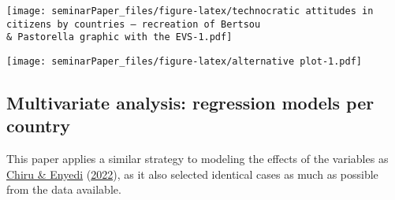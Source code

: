 \documentclass[
  12pt,
  english,
]{article}
\begin{document}
\texttt{[image: seminarPaper\_files/figure-latex/technocratic attitudes in citizens by countries --- recreation of Bertsou \\\& Pastorella graphic with the EVS-1.pdf]}

\texttt{[image: seminarPaper\_files/figure-latex/alternative plot-1.pdf]}

\hypertarget{multivariate-analysis-regression-models-per-country}{%
\subsection{Multivariate analysis: regression models per
country}\label{multivariate-analysis-regression-models-per-country}}

This paper applies a similar strategy to modeling the effects of the
variables as \protect\hyperlink{ref-chiru2022wants}{Chiru \& Enyedi}
(\protect\hyperlink{ref-chiru2022wants}{2022}), as it also selected
identical cases as much as possible from the data available.
\end{document}
